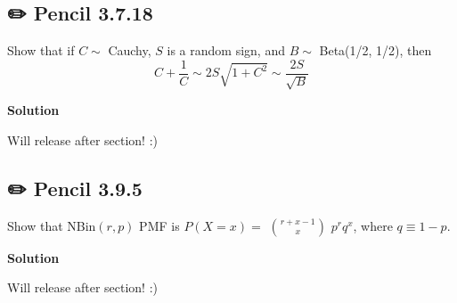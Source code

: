 \documentclass[
  letterpaper,
  DIV=11,
  numbers=noendperiod]{scrreprt}
\theoremstyle{definition}
\theoremstyle{plain}
\theoremstyle{remark}
\begin{document}
\hypertarget{pencil-3.7.18}{%
\subsection*{✏️ Pencil 3.7.18}\label{pencil-3.7.18}}

Show that if \(C\sim\) Cauchy, \(S\) is a random sign, and \(B\sim\)
Beta(1/2, 1/2), then
\[C+\frac{1}{C} \sim 2S\sqrt{1+C^2}\sim \frac{2S}{\sqrt{B}}\]

\begin{tcolorbox}[enhanced jigsaw, leftrule=.75mm, colframe=quarto-callout-tip-color-frame, colback=white, breakable, opacityback=0, left=2mm, bottomrule=.15mm, arc=.35mm, rightrule=.15mm, toprule=.15mm]
\begin{minipage}[t]{5.5mm}
\textcolor{quarto-callout-tip-color}{\faLightbulb}
\end{minipage}%
\begin{minipage}[t]{\textwidth - 5.5mm}

\textbf{Solution}\vspace{2mm}

Will release after section! :)

\end{minipage}%
\end{tcolorbox}

\hypertarget{pencil-3.9.5}{%
\subsection*{✏️ Pencil 3.9.5}\label{pencil-3.9.5}}

Show that NBin\((r,p)\) PMF is \(P(X=x)=\) \(r+x-1 \choose x\)
\(p^r q^x\), where \(q\equiv 1-p\).

\begin{tcolorbox}[enhanced jigsaw, leftrule=.75mm, colframe=quarto-callout-tip-color-frame, colback=white, breakable, opacityback=0, left=2mm, bottomrule=.15mm, arc=.35mm, rightrule=.15mm, toprule=.15mm]
\begin{minipage}[t]{5.5mm}
\textcolor{quarto-callout-tip-color}{\faLightbulb}
\end{minipage}%
\begin{minipage}[t]{\textwidth - 5.5mm}

\textbf{Solution}\vspace{2mm}

Will release after section! :)

\end{minipage}%
\end{tcolorbox}
\end{document}
